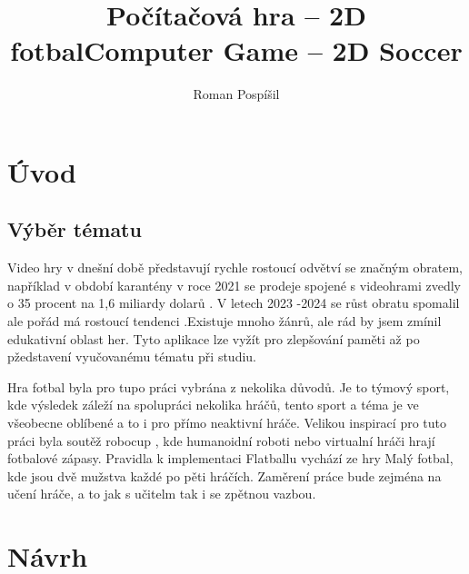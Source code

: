 \documentclass[
  program=ainfk,
  biblatex,
  language=czech,
  figures=true,
  tables ,
  sourcecodes=true,
  glossaries=true,
  index
]{kidiplom}
\title{Počítačová hra – 2D fotbal}
\title[english]{Computer Game – 2D Soccer}
\author{Roman Pospíšil}
\begin{document}
\maketitle




\newcommand{\BibLaTeX}{\textsc{Bib}\LaTeX}


\section{Úvod}
\subsection{Výběr tématu}
Video hry v dnešní době  představují rychle rostoucí odvětví se značným obratem, například v období karantény v roce 2021 se prodeje spojené s videohrami zvedly o 35 procent na 1,6 miliardy dolarů \cite{1}. V letech 2023 -2024 se růst obratu spomalil ale pořád má rostoucí tendenci .Existuje mnoho žánrů, ale rád by jsem zmínil edukativní oblast her. Tyto aplikace lze vyžít pro zlepšování paměti až po pžedstavení vyučovanému tématu při studiu.

Hra fotbal byla pro tupo práci vybrána z nekolika důvodů. Je to týmový sport, kde výsledek záleží na spolupráci nekolika hráčů, tento sport a téma je ve všeobecne oblíbené a to i pro přímo neaktivní hráče.
Velikou inspirací pro tuto práci byla soutěž robocup \cite{2}, kde humanoidní roboti nebo virtualní  hráči hrají fotbalové zápasy. Pravidla k implementaci Flatballu vychází ze hry Malý fotbal, kde jsou  dvě mužstva každé po pěti hráčích. Zaměrení práce bude zejména na učení hráče, a to jak s učitelm tak i se zpětnou vazbou.
 



\section{Návrh}
\end{document}
